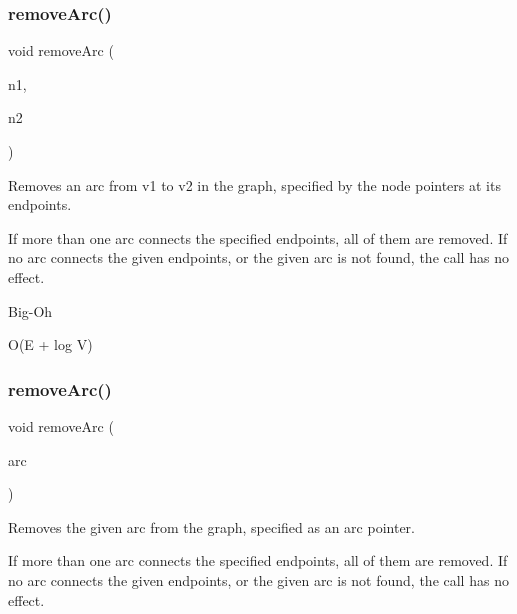 \subsubsection{\texorpdfstring{remove\+Arc()}{removeArc()}\hspace{0.1cm}{\footnotesize\ttfamily [2/3]}}
{\footnotesize\ttfamily void remove\+Arc (\begin{DoxyParamCaption}\item[{\mbox{\hyperlink{classVertexGen}{Vertex\+Gen}}$<$ V, E $>$  $\ast$}]{n1,  }\item[{\mbox{\hyperlink{classVertexGen}{Vertex\+Gen}}$<$ V, E $>$  $\ast$}]{n2 }\end{DoxyParamCaption})\hspace{0.3cm}{\ttfamily [inherited]}}



Removes an arc from v1 to v2 in the graph, specified by the node pointers at its endpoints. 

If more than one arc connects the specified endpoints, all of them are removed. If no arc connects the given endpoints, or the given arc is not found, the call has no effect. \begin{DoxyRefDesc}{Big-\/\+Oh}
\item[\mbox{\hyperlink{BigOh__BigOh000085}{Big-\/\+Oh}}]O(E + log V) \end{DoxyRefDesc}
\mbox{\label{classGraph_a9d6580d1b0228fe6c1a02dfe70de1abf}} 
\subsubsection{\texorpdfstring{remove\+Arc()}{removeArc()}\hspace{0.1cm}{\footnotesize\ttfamily [3/3]}}
{\footnotesize\ttfamily void remove\+Arc (\begin{DoxyParamCaption}\item[{Edge\+Gen$<$ V, E $>$  $\ast$}]{arc }\end{DoxyParamCaption})\hspace{0.3cm}{\ttfamily [inherited]}}



Removes the given arc from the graph, specified as an arc pointer. 

If more than one arc connects the specified endpoints, all of them are removed. If no arc connects the given endpoints, or the given arc is not found, the call has no effect.

